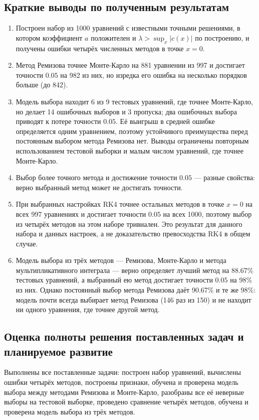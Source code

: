 \documentclass[14pt,a4paper]{extarticle}
\begin{document}
\subsection{Краткие выводы по полученным результатам}
\begin{enumerate}
\item Построен набор из 1000 уравнений с известными точными решениями,
в котором коэффициент $a$ положителен и $\lambda>\sup_x|c(x)|$
по построению, и получены ошибки четырёх численных методов в точке
$x=0$.
\item Метод Ремизова точнее Монте-Карло на 881 уравнении из 997
и достигает точности $0.05$ на 982 из них, но изредка его ошибка
на несколько порядков больше (до 842).
\item Модель выбора находит 6 из 9 тестовых уравнений, где точнее
Монте-Карло, но делает 14 ошибочных выборов и 3 пропуска; два ошибочных
выбора приводят к потере точности $0.05$. Её выигрыш в средней ошибке
определяется одним уравнением, поэтому устойчивого преимущества перед
постоянным выбором метода Ремизова нет. Выводы ограничены повторным
использованием тестовой выборки и малым числом уравнений, где точнее
Монте-Карло.
\item Выбор более точного метода и достижение точности $0.05$ ---
разные свойства: верно выбранный метод может не достигать точности.
\item При выбранных настройках RK4 точнее остальных методов в точке
$x=0$ на всех 997 уравнениях и достигает точности $0.05$ на всех 1000,
поэтому выбор из четырёх методов на этом наборе тривиален. Это результат
для данного набора и данных настроек, а не доказательство превосходства
RK4 в общем случае.
\item Модель выбора из трёх методов --- Ремизова, Монте-Карло и метода
мультипликативного интеграла --- верно определяет лучший метод
на 88.67\% тестовых уравнений, а выбранный ею метод достигает точности $0.05$
на 98\% из них. Однако постоянный выбор метода Ремизова даёт 90.67\%
и те же 98\%: модель почти всегда выбирает метод Ремизова (146 раз
из 150) и не находит ни одного уравнения, где точнее другой метод.
\end{enumerate}

\subsection{Оценка полноты решения поставленных задач и планируемое развитие}
Выполнены все поставленные задачи: построен набор уравнений, вычислены
ошибки четырёх методов, построены признаки, обучена и проверена модель
выбора между методами Ремизова и Монте-Карло, разобраны все её неверные
выборы на тестовой выборке, проведено сравнение четырёх методов, обучена
и проверена модель выбора из трёх методов.
\end{document}
